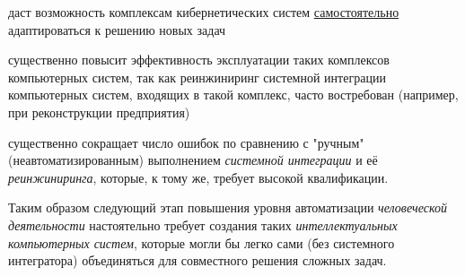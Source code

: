 {{\begin{scnitemize}
\item даст возможность комплексам кибернетических систем \uline{самостоятельно} адаптироваться к решению новых задач
\item существенно повысит эффективность эксплуатации таких комплексов компьютерных систем, так как реинжиниринг системной интеграции компьютерных систем, входящих в такой комплекс, часто востребован (например, при реконструкции предприятия)
\item существенно сокращает число ошибок по сравнению с "ручным"{} (неавтоматизированным) выполнением \textit{системной интеграции} и её \textit{реинжиниринга}, которые, к тому же, требует высокой квалификации.
\end{scnitemize}
Таким образом следующий этап повышения уровня автоматизации \textit{человеческой деятельности} настоятельно требует создания таких \textit{интеллектуальных компьютерных систем}, которые могли бы легко сами (без системного интегратора) объединяться для совместного решения сложных задач. 
}
}

\bigskip
\scnfragmentcaption

